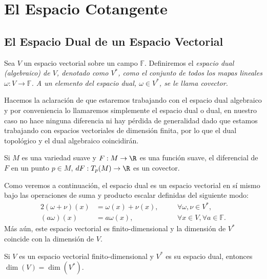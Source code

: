 \section{El Espacio Cotangente}\label{Sección: Espacio Cotangente}
\subsection{El Espacio Dual de un Espacio Vectorial}

\begin{definition}
	Sea $V$ un espacio vectorial sobre un campo $\mathbb{F}$. Definiremos el \it{espacio dual (algebraico) de $V$}, denotado como $V^*$, como el conjunto de todos los mapas lineales $\omega: V \to \mathbb{F}$. A un elemento del espacio dual, $\omega \in V^*$, se le llama \it{covector}.
\end{definition}

Hacemos la aclaración de que estaremos trabajando con el espacio dual algebraico y por conveniencia lo llamaremos simplemente el espacio dual o dual, en nuestro caso no hace ninguna diferencia ni hay pérdida de generalidad dado que estamos trabajando con espacios vectoriales de dimensión finita, por lo que el dual topológico y el dual algebraico coincidirán.

\begin{example}
	Si $M$ es una variedad suave y $F: M \to \R$ es una función suave, el diferencial de $F$ en un punto $p \in M$, $dF: T_p(M) \to \R$ es un covector.
\end{example}

Como veremos a continuación, el espacio dual es un espacio vectorial en sí mismo bajo las operaciones de suma y producto escalar definidas del siguiente modo:
\begin{alignat*}{2}
	(\omega+\nu)(x) & =\omega(x)+\nu(x), \quad &  & \forall \omega,\nu \in V^{*},           \\
	(a\omega)(x)    & = a\omega(x), \quad      &  & \forall x\in V,\forall a \in\mathbb{F}.
\end{alignat*}
Más aún, este espacio vectorial es finito-dimensional y la dimensión de $V^{*}$ coincide con la dimensión de $V$.

\begin{theorem}\label{Teorema: Dimensión del Espacio Dual}
	Si $V$ es un espacio vectorial finito-dimensional y $V^{*}$ es su espacio dual, entonces $\dim(V) = \dim(V^{*})$.
\end{theorem}

